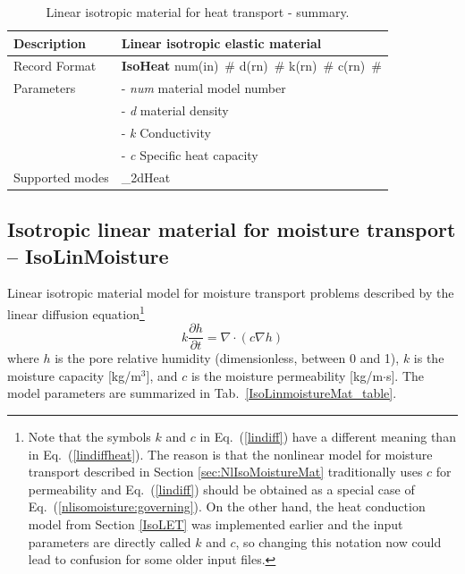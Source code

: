 \documentclass[a4paper]{article}
\newcommand{\descitem}[1]{{\noindent \bf #1}}
\newcommand{\elemparam}[2]{{{#1\tiny (#2)}~\#}}
\newcommand{\param}[1]{{\it #1}}
\newcommand{\refeq}[1]{Eq.~(\ref{#1})}
\begin{document}
\begin{table}[!htb]
\begin{tabular}{|l|p{9cm}|}
\hline
Description & Linear isotropic elastic material\\
\hline
Record Format & \descitem{IsoHeat} \elemparam{num}{in}
\elemparam{d}{rn} \elemparam{k}{rn} \elemparam{c}{rn}\\
Parameters &- \param{num} material model number\\
&- \param{d} material density\\
&- \param{k} Conductivity\\
&- \param{c} Specific heat capacity\\
Supported modes& \_2dHeat\\
\hline
\end{tabular}
\caption{Linear isotropic material for heat transport - summary.}
\label{Isoheat_table}
\end{table}


\subsection{Isotropic linear material for moisture transport -- IsoLinMoisture}
\label{IsoLinMoistureMat}
Linear isotropic material model for moisture transport problems described
by the linear diffusion equation\footnote{Note that the symbols $k$ and $c$
in \refeq{lindiff} have a different meaning than in \refeq{lindiffheat}.
The reason is that the nonlinear model for moisture transport described
in Section \ref{sec:NlIsoMoistureMat} traditionally
uses $c$ for permeability and \refeq{lindiff} should be obtained
as a special case of \refeq{nlisomoisture:governing}. 
On the other hand, the heat conduction model
from Section \ref{IsoLET} was implemented earlier and the input parameters
are directly called $k$ and $c$, so changing this notation now could lead
to confusion for some older input files.}
\begin{equation}\label{lindiff}
k\frac{\partial h}{\partial t} = \nabla \cdot \left( c \nabla h \right)
\end{equation}
where $h$ is the pore relative humidity (dimensionless, between 0 and 1), 
$k$ is the moisture capacity [kg/m$^3$],
and $c$ is the moisture permeability [kg/m$\cdot$s].
The model parameters are summarized
in Tab.~\ref{IsoLinmoistureMat_table}.
\end{document}
